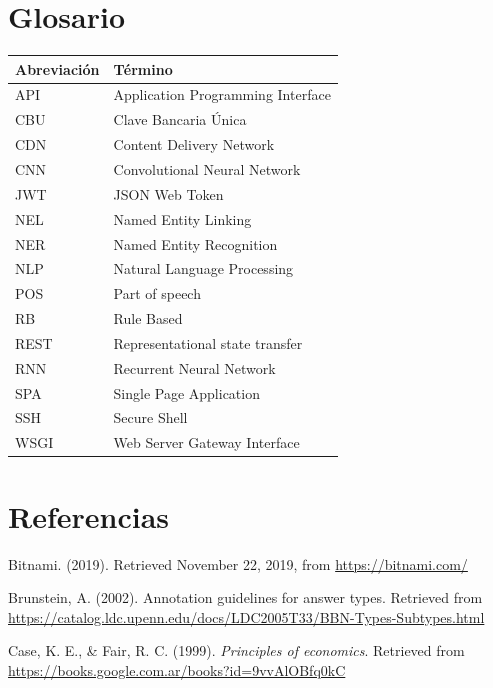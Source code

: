 \documentclass[12pt,a4paper,]{scrartcl}
\begin{document}
\newpage

\hypertarget{glosario}{%
\section*{Glosario}\label{glosario}}

\begin{tabular}{ll}
\toprule
Abreviación & Término\\
\midrule
API & Application Programming Interface\\
CBU & Clave Bancaria Única\\
CDN & Content Delivery Network\\
CNN & Convolutional Neural Network\\
JWT & JSON Web Token\\
\addlinespace
NEL & Named Entity Linking\\
NER & Named Entity Recognition\\
NLP & Natural Language Processing\\
POS & Part of speech\\
RB & Rule Based\\
\addlinespace
REST & Representational state transfer\\
RNN & Recurrent Neural Network\\
SPA & Single Page Application\\
SSH & Secure Shell\\
WSGI & Web Server Gateway Interface\\
\bottomrule
\end{tabular}

\hypertarget{referencias}{%
\section*{Referencias}\label{referencias}}

\hypertarget{refs}{}
\leavevmode\hypertarget{ref-bitnami}{}%
Bitnami. (2019). Retrieved November 22, 2019, from \url{https://bitnami.com/}

\leavevmode\hypertarget{ref-brunstein2002}{}%
Brunstein, A. (2002). Annotation guidelines for answer types. Retrieved from \url{https://catalog.ldc.upenn.edu/docs/LDC2005T33/BBN-Types-Subtypes.html}

\leavevmode\hypertarget{ref-lawOfDiminishingReturns}{}%
Case, K. E., \& Fair, R. C. (1999). \emph{Principles of economics}. Retrieved from \url{https://books.google.com.ar/books?id=9vvAlOBfq0kC}
\end{document}

